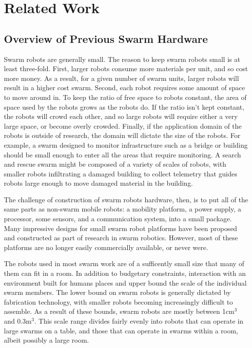 \documentclass[]{article}
\begin{document}
\section{Related Work}

\subsection{Overview of Previous Swarm Hardware}

Swarm robots are generally small. 
The reason to keep swarm robots small is at least three-fold. 
First, larger robots consume more materials per unit, and so cost more money.
As a result, for a given number of swarm units, larger robots will result in a higher cost swarm. 
Second, each robot requires some amount of space to move around in. 
To keep the ratio of free space to robots constant, the area of space used by the robots grows as the robots do. 
If the ratio isn't kept constant, the robots will crowd each other, and so large robots will require either a very large space, or become overly crowded.
Finally, if the application domain of the robots is outside of research, the domain will dictate the size of the robots. 
For example, a swarm designed to monitor infrastructure such as a bridge or building should be small enough to enter all the areas that require monitoring. 
A search and rescue swarm might be composed of a variety of scales of robots, with smaller robots infiltrating a damaged building to collect telemetry that guides robots large enough to move damaged material in the building. 


The challenge of construction of swarm robots hardware, then, is to put all of the same parts as non-swarm mobile robots: a mobility platform, a power supply, a processor, some sensors, and a communication system, into a small package.
Many impressive designs for small swarm robot platforms have been proposed and constructed as part of research in swarm robotics. 
However, most of these platforms are no longer easily commercially available, or never were. 

The robots used in most swarm work are of a sufficently small size that many of them can fit in a room. In addition to budgetary constraints, interaction with an environment built for humans places and upper bound the scale of the individual swarm members.  
The lower bound on swarm robots is generally dictated by fabrication technology, with smaller robots becoming increasingly difficult to assemble. 
As a result of these bounds, swarm robots are mostly between 1cm$^3$ and 0.3m$^3$. 
This scale range divides fairly evenly into robots that can operate in large swarms on a table, and those that can operate in swarms within a room, albeit possibly a large room. 
\end{document}
